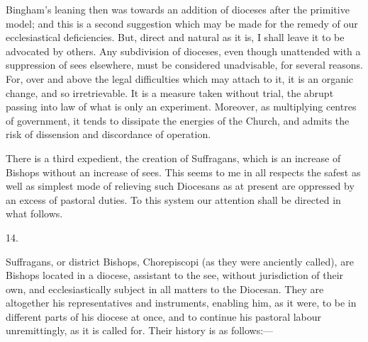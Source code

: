 Bingham's leaning then was towards an addition of
dioceses after the primitive model; and this is a second suggestion
which may be made for the remedy of our ecclesiastical deficiencies.
But, direct and natural as it is, I shall leave it to be advocated by
others. Any subdivision of dioceses, even though unattended with a
suppression of sees elsewhere, must be considered unadvisable, for
several reasons. For, over and above the legal difficulties which may
attach to it, it is an organic change, and so irretrievable. It is a
measure taken without trial, the abrupt passing into law of what is
only an experiment. Moreover, as multiplying centres of government, it
tends to dissipate the energies of the Church, and admits the risk of
dissension and discordance of operation.

There is a third expedient, the creation of
Suffragans, which is an increase of Bishops without an increase of
sees. This seems to me in all respects the safest as well as simplest
mode of relieving such Diocesans as at present are oppressed by
an excess of pastoral duties. To this system our attention shall be
directed in what follows.

14.

Suffragans, or district Bishops, Chorepiscopi (as
they were anciently called), are Bishops located in a diocese,
assistant to the see, without jurisdiction of their own, and
ecclesiastically subject in all matters to the Diocesan. They are
altogether his representatives and instruments, enabling him, as it
were, to be in different parts of his diocese at once, and to continue
his pastoral labour unremittingly, as it is called for. Their history
is as follows:—

